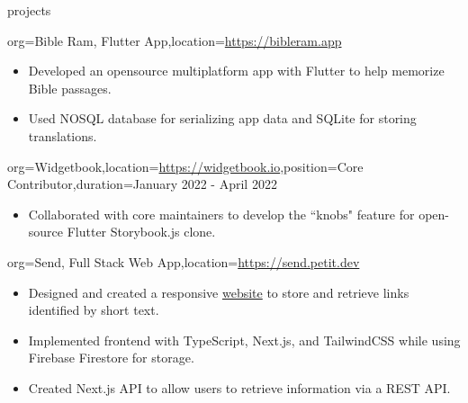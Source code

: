 \documentclass{resume}
\begin{document}
\begin{ResumeSection}{projects}
    \begin{ResumeProject}{org={Bible Ram, Flutter
        App},location={\href{https://bibleram.app}{https://bibleram.app}}}
        \begin{itemize}
            \item {Developed an opensource multiplatform app with Flutter to
                help memorize Bible passages.} 
            \item {Used NOSQL database for serializing app data and SQLite for
                storing translations.}
        \end{itemize}
    \end{ResumeProject}
    \begin{ResumeProject}{org={Widgetbook},location={\href{https://www.widgetbook.io/}{https://widgetbook.io}},position={Core Contributor},duration={January 2022 - April 2022}}
        \begin{itemize}
            \item Collaborated with core maintainers to develop the ``knobs"
                feature for open-source Flutter Storybook.js clone.
        \end{itemize}
    \end{ResumeProject}
    \begin{ResumeProject}{org={Send, Full Stack Web App},location={\href{https://send.petit.dev}{https://send.petit.dev}}}
        \begin{itemize}
            \item {Designed and created a responsive \href{https://send.petit.dev}{website} to store and retrieve links identified by short text.}
            \item {Implemented frontend with TypeScript, Next.js, and
                TailwindCSS while using Firebase Firestore for storage.}
            \item {Created Next.js API to allow users to retrieve
                information via a REST API.}
        \end{itemize}
    \end{ResumeProject}
\end{ResumeSection}
\end{document}
